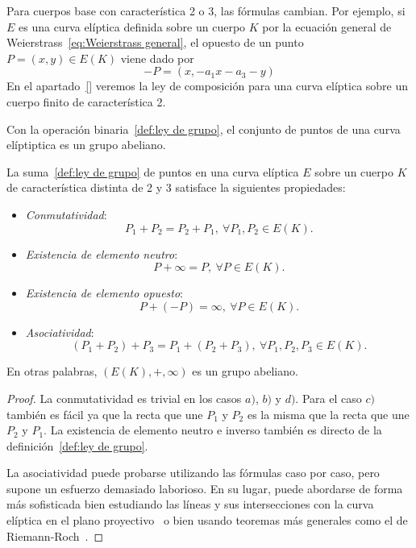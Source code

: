 \begin{nota}
	Para cuerpos base con característica 2 o 3, las fórmulas cambian. Por ejemplo, si $E$ es una curva elíptica definida sobre un cuerpo $K$ por la ecuación general de Weierstrass~\eqref{eq:Weierstrass general}, el opuesto de un punto $P = (x, y) \in E(K)$ viene dado por
	$$
		- P = (x, -a_1 x - a_3 - y)
	$$
	En el apartado~\ref{} veremos la ley de composición para una curva elíptica sobre un cuerpo finito de característica 2.
\end{nota}

Con la operación binaria~\ref{def:ley de grupo}, el conjunto de puntos de una curva elíptiptica es un grupo abeliano.

\begin{teorema}\label{th:grupo abeliano}
	La suma~\ref{def:ley de grupo} de puntos en una curva elíptica $E$ sobre un cuerpo $K$ de característica distinta de 2 y 3 satisface la siguientes propiedades:
	\begin{itemize}
		\item \emph{Conmutatividad}: $$P_1 + P_2 = P_2 + P_1,\ \forall P_1, P_2 \in E(K).$$
		\item \emph{Existencia de elemento neutro}: $$P + \infty = P,\ \forall P \in E(K).$$
		\item \emph{Existencia de elemento opuesto}: $$P + (-P) = \infty,\ \forall P \in E(K).$$
		\item \emph{Asociatividad}: $$(P_1 + P_2) + P_3 = P_1 + (P_2 + P_3),\ \forall P_1, P_2, P_3 \in E(K).$$
	\end{itemize}
	En otras palabras, $(E(K), +, \infty)$ es un grupo abeliano.
\end{teorema}
\begin{proof}
La conmutatividad es trivial en los casos $a)$, $b)$ y $d)$. Para el caso $c)$ también es fácil ya que la recta que une $P_1$ y $P_2$ es la misma que la recta que une $P_2$ y $P_1$. La existencia de elemento neutro e inverso también es directo de la definición~\ref{def:ley de grupo}.

La asociatividad puede probarse utilizando las fórmulas caso por caso, pero supone un esfuerzo demasiado laborioso. En su lugar, puede abordarse de forma más sofisticada bien estudiando las líneas y sus intersecciones con la curva elíptica en el plano proyectivo~\cite[sec. 2.4]{Washington:2008} o bien usando teoremas más generales como el de Riemann-Roch~\cite[teo. III.3.4.e]{Silverman:2009}.
\end{proof}

